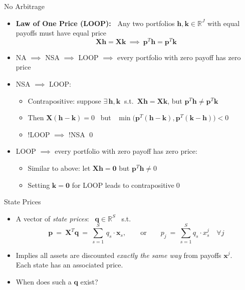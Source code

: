 \documentclass[aspectratio=1610]{beamer}
\newcommand{\st}{s.t.\ }
\newcommand{\eq}{\ =\ }
\newcommand{\bb}{\mathbb}
\begin{document}
\begin{frame}{No Arbitrage}
\begin{itemize}
  \item {\bf Law of One Price (LOOP):\ } Any two portfolios $\bm h, \bm k \in \bb R^J$ with equal payoffs must have equal price
  $$\bm{Xh} = \bm {Xk} \ \implies \ \bm p^T \bm h = \bm p^T \bm k$$
  \item NA $\implies$ NSA $\implies$ LOOP $\implies$ every portfolio with zero payoff has zero price
  \vspace{2ex}

  \item NSA $\implies$ LOOP: \
  \begin{itemize}
    \item Contrapositive: suppose $\exists\, \bm {h,k}\ $ \st $\bm{Xh}=\bm{Xk}$, but $\bm p^T\bm h \neq \bm p^T\bm k$
    \item Then $\bm X(\bm h - \bm k) = 0$ \ but \ $\min\big(\bm p^T(\bm h - \bm k), \bm p^T(\bm k - \bm h)\big) < 0$
    \item !LOOP $\implies$ !NSA \qed
  \end{itemize}
  \item LOOP $\implies$ every portfolio with zero payoff has zero price:
  \begin{itemize}
    \item Similar to above: let $\bm{Xh}=\bm 0$ but $\bm p^T\bm h\neq 0$
    \item Setting $\bm k=\bm 0$ for LOOP leads to contrapositive\qed
  \end{itemize}
\end{itemize}
\end{frame}

\begin{frame}{State Prices}
\begin{itemize}
  \item A vector of {\em state prices}: \ $\bm q\in\bb R^S$ \ \st
  $$\bm p \eq \bm X^T\bm q \eq \sum_{s=1}^S\, q_s \cdot \bm x_s,
  \qquad \text{or} \qquad
  p_j \eq \sum_{s=1}^S q_s \cdot x^j_s \quad \forall j$$

  \item Implies all assets are discounted {\em exactly the same way} from payoffs $\bm x^j$. \\ Each state has an associated price.
  \vspace{2ex}

  \item When does such a $\bm q$ exist?
\end{itemize}

\end{frame}
\end{document}
